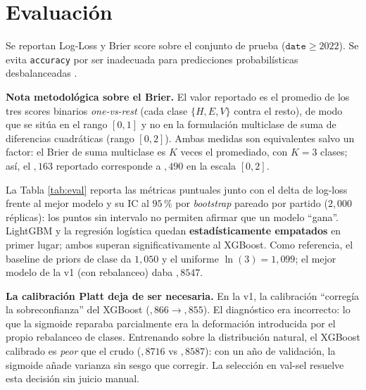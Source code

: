 \documentclass[conference]{IEEEtran}
\begin{document}
\section{Evaluaci\'on}
\label{sec:eval}

Se reportan Log-Loss y Brier score sobre el conjunto de prueba
($\texttt{date}\ge 2022$). Se evita \texttt{accuracy} por ser
inadecuada para predicciones probabil\'isticas desbalanceadas
\cite{brier1950}.

\textbf{Nota metodol\'ogica sobre el Brier.} El valor reportado es el
promedio de los tres scores binarios \emph{one-vs-rest} (cada clase
$\{H,E,V\}$ contra el resto), de modo que se sit\'ua en el rango
$[0,1]$ y no en la formulaci\'on multiclase de suma de diferencias
cuadr\'aticas (rango $[0,2]$). Ambas medidas son equivalentes salvo un
factor: el Brier de suma multiclase es $K$ veces el promediado, con
$K=3$ clases; as\'i, el ${,}163$ reportado corresponde a ${,}490$ en
la escala $[0,2]$.

La Tabla \ref{tab:eval} reporta las m\'etricas puntuales junto con el
delta de log-loss frente al mejor modelo y su IC al $95\,\%$ por
\emph{bootstrap} pareado por partido ($2{,}000$ r\'eplicas): los puntos
sin intervalo no permiten afirmar que un modelo ``gana''. LightGBM y la
regresi\'on log\'istica quedan \textbf{estad\'isticamente empatados} en
primer lugar; ambos superan significativamente al XGBoost. Como
referencia, el baseline de priors de clase da $1{,}050$ y el uniforme
$\ln(3) = 1{,}099$; el mejor modelo de la v1 (con rebalanceo) daba
${,}8547$.

\textbf{La calibraci\'on Platt deja de ser necesaria.} En la v1, la
calibraci\'on ``correg\'ia la sobreconfianza'' del XGBoost
(${,}866\!\to\!{,}855$). El diagn\'ostico era incorrecto: lo que la
sigmoide reparaba parcialmente era la deformaci\'on introducida por el
propio rebalanceo de clases. Entrenando sobre la distribuci\'on natural,
el XGBoost calibrado es \emph{peor} que el crudo (${,}8716$ vs
${,}8587$): con un a\~no de validaci\'on, la sigmoide a\~nade varianza
sin sesgo que corregir. La selecci\'on en val-sel resuelve esta decisi\'on
sin juicio manual.
\end{document}
